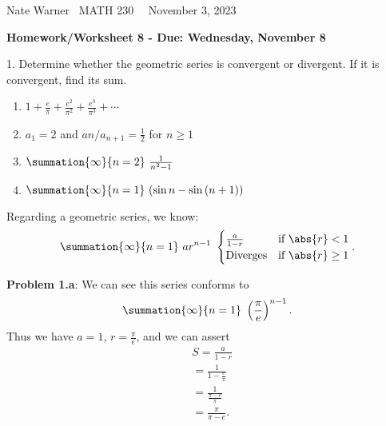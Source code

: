 \documentclass{report}
\title{\Huge{}}
\author{\huge{Nathan Warner}}
\date{\huge{}}
\begin{document}
    \pagebreak \bigbreak \noindent
    Nate Warner \ \quad \quad \quad \quad \quad \quad \quad \quad \quad \quad \quad \quad \quad \quad \quad \quad \quad  MATH 230 \quad  \quad \quad \quad \quad \quad \quad \quad \quad \ \ \quad \quad November 3, 2023
    \begin{center}
        \textbf{Homework/Worksheet 8 - Due: Wednesday, November 8}
    \end{center}
    \bigbreak \noindent 
    \begin{mdframed}
        1. Determine whether the geometric series is convergent or divergent. If it is convergent, find its sum.
        \begin{enumerate}[label=(\alph*)]
            \item $1+\frac{e}{\pi} + \frac{e^{2}}{\pi^{2}} + \frac{e^{3}}{\pi^{3}} + \cdots$
            \item $a_{1} = 2$ and $an/a_{n+1} = \frac{1}{2}$ for $n \geq 1$
            \item $\summation{\infty}{n=2}\ \frac{1}{n^{2}-1}\  $
             \item $\summation{\infty}{n=1}\ (\sin{n} - \sin{(n+1)})\ $
        \end{enumerate}
    \end{mdframed}

    \bigbreak \noindent 
    \begin{remark}
        Regarding a geometric series, we know:
        \begin{align*}
            \summation{\infty}{n=1}\ ar^{n-1}\  
                    \begin{cases}
                         \frac{a}{1-r} & \text{if } \abs{r} < 1 \\
                         \text{Diverges} & \text{if }  \abs{r} \geq 1
                    \end{cases}
        .\end{align*}
    \end{remark}
    
    \bigbreak \noindent 
    \textbf{Problem 1.a}:
    We can see this series conforms to 
    \begin{align*}
       \summation{\infty}{n=1}\ \left(\frac{\pi}{e}\right)^{n-1}
    .\end{align*}
    \bigbreak \noindent 
    Thus we have $a=1$, $r=\frac{\pi}{e}$, and we can assert
    \begin{align*}
       &S = \frac{a}{1-r}  \\
       &=\frac{1}{1-\frac{e}{\pi}} \\
        &=\frac{1}{\frac{\pi-e}{\pi}} \\
        &=\frac{\pi}{\pi-e}
    .\end{align*}
\end{document}
